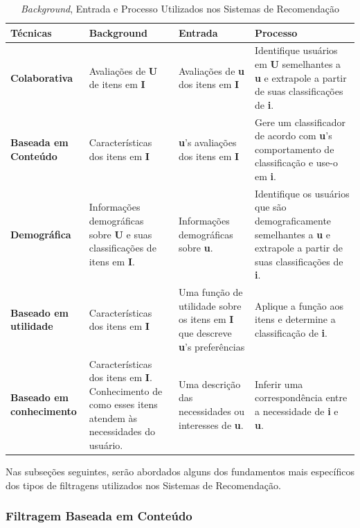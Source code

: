 \begin{table}[htbp]
	\centering
	\caption{\emph{Background}, Entrada e Processo Utilizados nos Sistemas de Recomendação}
	\label{tab02}
	\begin{tabular}{p{3cm}p{3.5cm}p{3cm}p{4.5cm}}
	\toprule
	\textbf{Técnicas} & \textbf{Background} & \textbf{Entrada}  &  \textbf{Processo}  \\ 
	\midrule
	\textbf{Colaborativa} &  Avaliações de \textbf{U} de itens em \textbf{I}    &  Avaliações de \textbf{u} dos itens em \textbf{I}   &   Identifique usuários em \textbf{U} semelhantes a \textbf{u} e extrapole a partir de suas classificações de \textbf{i}.       \\ 
	\midrule
	\textbf{Baseada em Conteúdo} &  Características dos itens em \textbf{I}  & \textbf{u}'s avaliações dos itens em \textbf{I}   &   Gere um classificador de acordo com \textbf{u}'s comportamento de classificação e use-o em \textbf{i}.  \\ 
	\midrule
	\textbf{Demográfica} &  Informações demográficas sobre \textbf{U} e suas classificações de itens em \textbf{I}.       & Informações demográficas sobre \textbf{u}.   & Identifique os usuários que são demograficamente semelhantes a \textbf{u} e extrapole a partir de suas classificações de \textbf{i}.    \\ 
	\midrule
	\textbf{Baseado em utilidade} &  Características dos itens em \textbf{I}   & 
		Uma função de utilidade sobre os itens em \textbf{I} que descreve \textbf{u}'s preferências    & Aplique a função aos itens e determine a classificação de \textbf{i}.    \\ 
		\midrule
		\textbf{Baseado em conhecimento}  &  Características dos itens em \textbf{I}. Conhecimento de como esses itens atendem às necessidades do usuário.    & Uma descrição das necessidades ou interesses de \textbf{u}.  &   
		Inferir uma correspondência entre a necessidade de \textbf{i} e \textbf{u}.  \\ 
	\bottomrule
	\end{tabular}
\end{table}



Nas subseções seguintes, serão abordados alguns dos fundamentos mais específicos dos tipos de filtragens utilizados nos Sistemas de Recomendação.


\subsubsection{Filtragem Baseada em Conteúdo}


